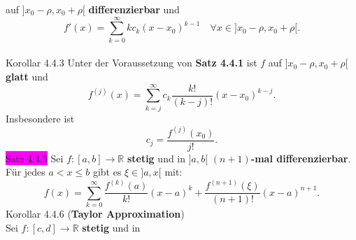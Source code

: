 \documentclass[landscape, 10pt]{article}
\newcommand{\R}{\mathbb{R}}
\begin{document}
\begin{multicols}{3}
\begin{equation*}
                     \end{equation*}
                     auf 
                     \textcolor{NavyBlue}{$]x_0-\rho,x_0+\rho[$} 
                     \textbf{differenzierbar} und
                     \begin{equation*}
                            f'(x)
                            =\sum_{k=0}^\infty kc_k(x-x_0)^{k-1}
                            \quad
                            \forall x\in]x_0-\rho,x_0+\rho[.
                     \end{equation*}\\
              \colorbox{BurntOrange}{Korollar 4.4.3} 
                     Unter der Voraussetzung von 
                     \textbf{Satz 4.4.1} ist 
                     \textcolor{NavyBlue}{$f$} auf 
                     \textcolor{NavyBlue}{
                     $]x_0-\rho,x_0+\rho[$} 
                     \textbf{glatt} und
                     \begin{equation*}
                            f^{(j)}(x)
                            =\sum_{k=j}^\infty c_k
                            \frac{k!}{(k-j)!}(x-x_0)^{k-j}.
                     \end{equation*}
                     Insbesondere ist 
                     \begin{equation*}
                            c_j=\frac{f^{(j)}(x_0)}{j!}.  
                     \end{equation*}
              \colorbox{magenta}{Satz 4.4.5} 
                     Sei \textcolor{NavyBlue}{
                     $f:[a,b]\longrightarrow\R$}
                     \textbf{stetig} und in 
                     \textcolor{NavyBlue}{$]a,b[$} 
                     \textbf{$(n+1)$-mal differenzierbar}. 
                     Für jedes \textcolor{NavyBlue}{
                     $a<x\leqslant b$} gibt es 
                     \textcolor{NavyBlue}{$\xi\in]a,x[$} mit:
                     \begin{equation*}
                            f(x)
                            =\sum_{k=0}^\infty
                            \frac{f^{(k)}(a)}{k!}(x-a)^k
                            +\frac{f^{(n+1)}(\xi)}{(n+1)!}
                            (x-a)^{n+1}.
                     \end{equation*}
              \colorbox{BurntOrange}{Korollar 4.4.6} 
              (\textbf{Taylor Approximation}) \\
                     Sei \textcolor{NavyBlue}{
                     $f:[c,d]\longrightarrow\R$} 
                     \textbf{stetig} und in 

\end{multicols}
\end{document}
